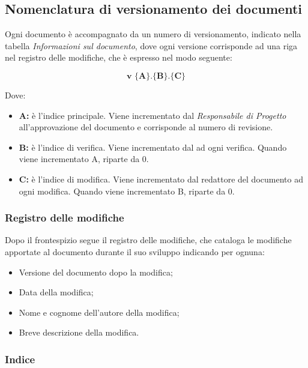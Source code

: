 \documentclass[../NormediProgetto.tex]{subfiles}
\begin{document}
\subsection{Nomenclatura di versionamento dei documenti}
Ogni documento è accompagnato da un numero di versionamento, indicato nella tabella \textit{Informazioni sul documento}, dove ogni versione corrisponde ad una riga nel registro delle modifiche, che è espresso nel modo seguente:

\[\textbf{v $\biggl\{$A$\biggr\}$.$\biggl\{$B$\biggr\}$.$\biggl\{$C$\biggr\}$}\]

Dove:

\begin{itemize}
    \item{\textbf{A:}} è l'indice principale. Viene incrementato dal \textit{Responsabile di Progetto} all’approvazione del documento e 
    corrisponde al numero di revisione.
    \item{\textbf{B:}} è l'indice di verifica. Viene incrementato dal  ad ogni verifica. Quando viene incrementato A, riparte da 0.
    \item{\textbf{C:}} è l'indice di modifica. Viene incrementato dal redattore del documento ad ogni modifica. Quando viene incrementato B, riparte da 0.
\end{itemize}

\subsubsection{Registro delle modifiche}

Dopo il frontespizio segue il registro delle modifiche, che cataloga le modifiche apportate al documento durante il suo sviluppo indicando per ognuna:

\begin{itemize}
    \item Versione del documento dopo la modifica;
    \item Data della modifica;
    \item Nome e cognome dell'autore della modifica;
    \item Breve descrizione della modifica.
\end{itemize}

\subsubsection{Indice}
\end{document}
